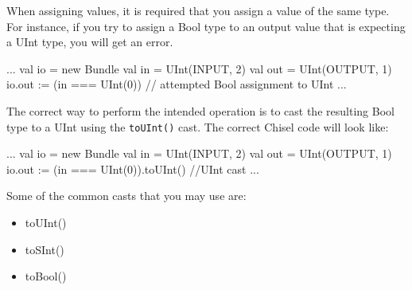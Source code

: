 \documentclass[twocolumn, 10pt]{article}
\begin{document}
When assigning values, it is required that you assign a value of the same type. For instance, if you try to assign a Bool type to an output value that is expecting a UInt type, you will get an error.

\begin{scala}
  ...
  val io  = new Bundle {
    val in  = UInt(INPUT, 2)
    val out = UInt(OUTPUT, 1)
  }
  io.out := (in === UInt(0)) // attempted Bool assignment to UInt
  ...
\end{scala}

The correct way to perform the intended operation is to cast the resulting Bool type to a UInt using the \verb+toUInt()+ cast. The correct Chisel code will look like:

\begin{scala}
  ...
  val io = new Bundle {
    val in  = UInt(INPUT, 2)
    val out = UInt(OUTPUT, 1)
  }
  io.out := (in === UInt(0)).toUInt() //UInt cast
  ...
\end{scala}

Some of the common casts that you may use are:

\begin{itemize}
\item toUInt()
\item toSInt()
\item toBool()
\end{itemize}
\end{document}
